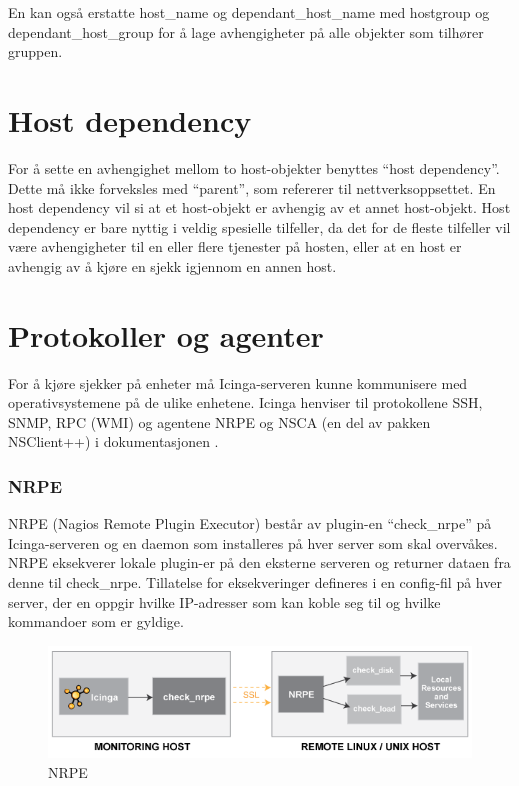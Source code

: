 En kan også erstatte host\_name og dependant\_host\_name med hostgroup og dependant\_host\_group for å lage avhengigheter på alle objekter som tilhører gruppen.

\section{Host dependency}
For å sette en avhengighet mellom to host-objekter benyttes ``host dependency''. Dette må ikke forveksles med ``parent'', som refererer til nettverksoppsettet. En host dependency vil si at et host-objekt er avhengig av et annet host-objekt. Host dependency er bare nyttig i veldig spesielle tilfeller, da det for de fleste tilfeller vil være avhengigheter til en eller flere tjenester på hosten\cite{hostandservicedep}, eller at en host er avhengig av å kjøre en sjekk igjennom en annen host.

\section{Protokoller og agenter}
For å kjøre sjekker på enheter må Icinga-serveren kunne kommunisere med operativsystemene på de ulike enhetene. Icinga henviser til protokollene SSH, SNMP, RPC (WMI) og agentene NRPE og NSCA (en del av pakken NSClient++) i dokumentasjonen\cite{icingaintegration} \cite{icingaadditionalsoftware}. 

\subsubsection{NRPE}\label{sec:nrpe}
NRPE (Nagios Remote Plugin Executor) består av plugin-en ``check\_nrpe'' på Icinga-serveren og en daemon som installeres på hver server som skal overvåkes. NRPE eksekverer lokale plugin-er på den eksterne serveren og returner dataen fra denne til check\_nrpe. Tillatelse for eksekveringer defineres i en config-fil på hver server, der en oppgir hvilke IP-adresser som kan koble seg til og hvilke kommandoer som er gyldige. 

\begin{figure}[H]
    \centering
    \includegraphics[scale=0.6]{img/nrpe.png}
    \caption{NRPE}
    \label{nrpe}
\end{figure}

